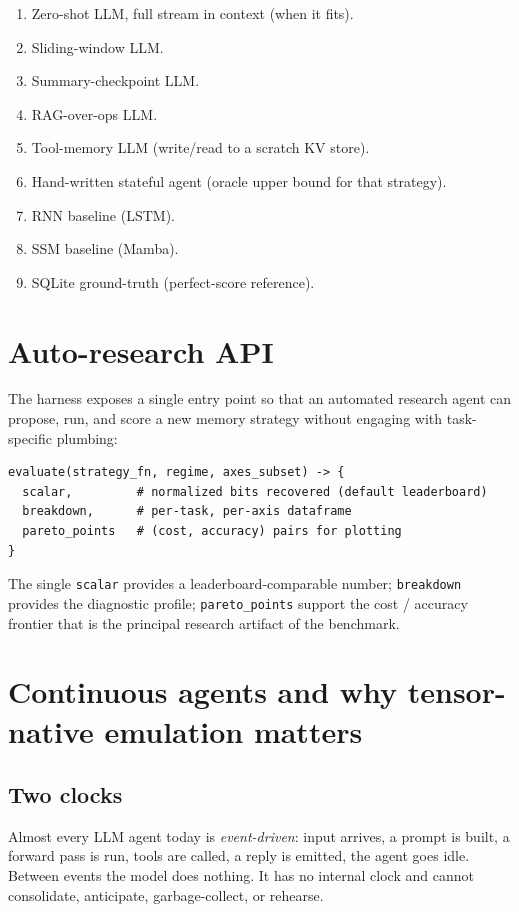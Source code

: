 \documentclass[11pt]{article}
\begin{document}
\begin{enumerate}[leftmargin=*]
  \item Zero-shot LLM, full stream in context (when it fits).
  \item Sliding-window LLM.
  \item Summary-checkpoint LLM.
  \item RAG-over-ops LLM.
  \item Tool-memory LLM (write/read to a scratch KV store).
  \item Hand-written stateful agent (oracle upper bound for that
    strategy).
  \item RNN baseline (LSTM).
  \item SSM baseline (Mamba).
  \item SQLite ground-truth (perfect-score reference).
\end{enumerate}

\section{Auto-research API}
\label{sec:api}

The harness exposes a single entry point so that an automated research
agent can propose, run, and score a new memory strategy without engaging
with task-specific plumbing:

\begin{lstlisting}
evaluate(strategy_fn, regime, axes_subset) -> {
  scalar,         # normalized bits recovered (default leaderboard)
  breakdown,      # per-task, per-axis dataframe
  pareto_points   # (cost, accuracy) pairs for plotting
}
\end{lstlisting}

The single \texttt{scalar} provides a leaderboard-comparable number;
\texttt{breakdown} provides the diagnostic profile; \texttt{pareto\_points}
support the cost / accuracy frontier that is the principal research
artifact of the benchmark.

\section{Continuous agents and why tensor-native emulation matters}
\label{sec:continuous}

\subsection{Two clocks}

Almost every LLM agent today is \emph{event-driven}: input arrives, a
prompt is built, a forward pass is run, tools are called, a reply is
emitted, the agent goes idle. Between events the model does nothing. It
has no internal clock and cannot consolidate, anticipate,
garbage-collect, or rehearse.
\end{document}

